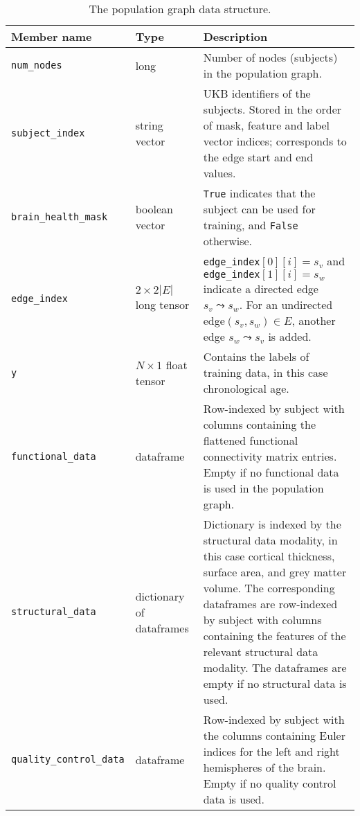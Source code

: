 \begin{table}[]
    \caption{The population graph data structure.}\label{table:structural-features}
    \centering
    \begin{tabular}{lp{2.75cm}p{8cm}}
        \hline
    \textbf{Member name} & \textbf{Type} & \textbf{Description} \\ \hline
    \texttt{num\_nodes} & long & Number of nodes (subjects) in the population graph. \\
    \texttt{subject\_index} & string vector & UKB identifiers of the subjects. Stored in the order of mask, feature and label vector indices; corresponds to the edge start and end values. \\
    \texttt{brain\_health\_mask} & boolean vector & \texttt{True} indicates that the subject can be used for training, and \texttt{False} otherwise. \\
    \texttt{edge\_index} & $2\times 2|E|$ \hfill\newline long tensor & \texttt{edge\_index}$[0][i]=s_v$ and \hfill \newline \texttt{edge\_index}$[1][i]=s_w$ indicate a directed \hfill \newline edge $s_v \leadsto s_w$. For an undirected edge\hfill \newline $(s_v, s_w) \in E$, another edge $s_w \leadsto s_v$ is added. \\
    \texttt{y} & $N \times 1$ \hfill \newline float tensor & Contains the labels of training data, in this case chronological age. \\
    \texttt{functional\_data} & dataframe & Row-indexed by subject with columns containing the flattened functional connectivity matrix entries. Empty if no functional data is used in the population graph. \\
    \texttt{structural\_data} & dictionary of \hfill \newline dataframes & Dictionary is indexed by the structural data modality, in this case cortical thickness, surface area, and grey matter volume. The corresponding dataframes are row-indexed by subject with columns containing the features of the relevant structural data modality. The dataframes are empty if no structural data is used. \\
    \texttt{quality\_control\_data} & dataframe & Row-indexed by subject with the columns containing Euler indices for the left and right hemispheres of the brain. Empty if no quality control data is used. \\

\end{tabular}
\end{table}
